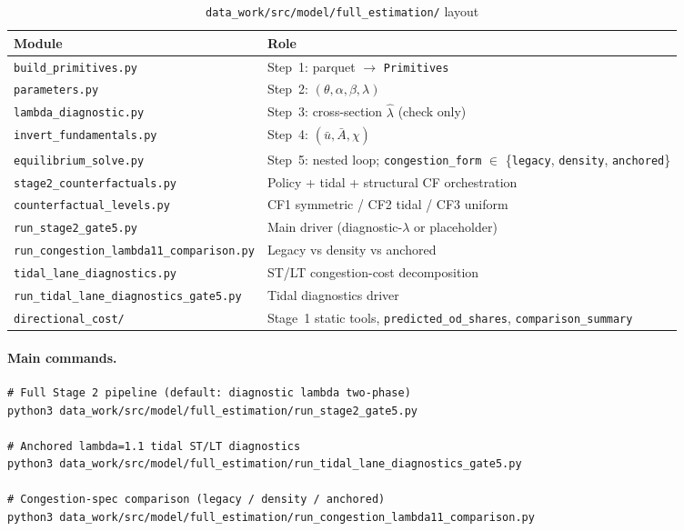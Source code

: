 \documentclass[12pt]{article}
\newcommand{\ubar}{\bar u}
\newcommand{\Abar}{\bar A}
\begin{document}
\begin{table}[htbp]
  \centering
  \caption{\texttt{data\_work/src/model/full\_estimation/} layout}
  \small
  \begin{tabular}{p{5.5cm}p{8.5cm}}
  \toprule
  Module & Role \\
  \midrule
  \texttt{build\_primitives.py} & Step~1: parquet $\to$ \texttt{Primitives} \\
  \texttt{parameters.py} & Step~2: $(\theta,\alpha,\beta,\lambda)$ \\
  \texttt{lambda\_diagnostic.py} & Step~3: cross-section $\hat\lambda$ (check only) \\
  \texttt{invert\_fundamentals.py} & Step~4: $(\ubar,\Abar,\chi)$ \\
  \texttt{equilibrium\_solve.py} & Step~5: nested loop; \texttt{congestion\_form} $\in$
        \{\texttt{legacy}, \texttt{density}, \texttt{anchored}\} \\
  \texttt{stage2\_counterfactuals.py} & Policy + tidal + structural CF orchestration \\
  \texttt{counterfactual\_levels.py} & CF1 symmetric / CF2 tidal / CF3 uniform \\
  \texttt{run\_stage2\_gate5.py} & Main driver (diagnostic-$\lambda$ or placeholder) \\
  \texttt{run\_congestion\_lambda11\_comparison.py} & Legacy vs density vs anchored \\
  \texttt{tidal\_lane\_diagnostics.py} & ST/LT congestion-cost decomposition \\
  \texttt{run\_tidal\_lane\_diagnostics\_gate5.py} & Tidal diagnostics driver \\
  \texttt{directional\_cost/} & Stage~1 static tools, \texttt{predicted\_od\_shares},
        \texttt{comparison\_summary} \\
  \bottomrule
  \end{tabular}
\end{table}

\paragraph{Main commands.}
\begin{verbatim}
# Full Stage 2 pipeline (default: diagnostic lambda two-phase)
python3 data_work/src/model/full_estimation/run_stage2_gate5.py

# Anchored lambda=1.1 tidal ST/LT diagnostics
python3 data_work/src/model/full_estimation/run_tidal_lane_diagnostics_gate5.py

# Congestion-spec comparison (legacy / density / anchored)
python3 data_work/src/model/full_estimation/run_congestion_lambda11_comparison.py
\end{verbatim}
\end{document}
